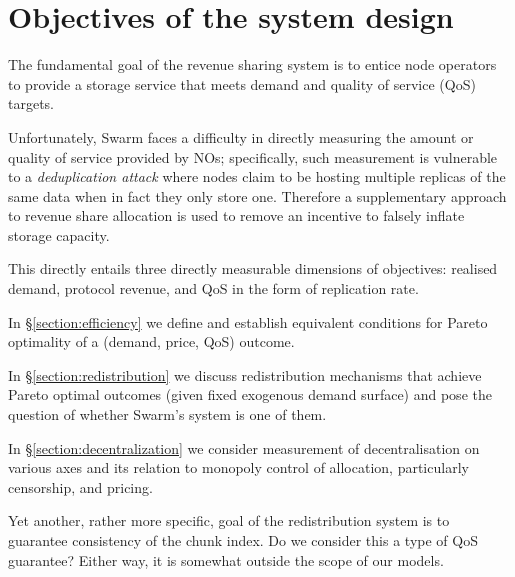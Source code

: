 \newpage

\section{Objectives of the system design}

\begin{notes}

  \item The fundamental goal of the revenue sharing system is to entice node operators to provide a storage service that meets demand and quality of service (QoS) targets.

  Unfortunately, Swarm faces a difficulty in directly measuring the amount or quality of service provided by NOs; specifically, such measurement is vulnerable to a \emph{deduplication attack} where nodes claim to be hosting multiple replicas of the same data when in fact they only store one.
  Therefore a supplementary approach to revenue share allocation is used to remove an incentive to falsely inflate storage capacity.

  \item This directly entails three directly measurable dimensions of objectives: realised demand, protocol revenue, and QoS in the form of replication rate.

  \item In \S\ref{section:efficiency} we define and establish equivalent conditions for Pareto optimality of a (demand, price, QoS) outcome.

  \item In \S\ref{section:redistribution} we discuss redistribution mechanisms that achieve Pareto optimal outcomes (given fixed exogenous demand surface) and pose the question of whether Swarm's system is one of them.

  \item In \S\ref{section:decentralization} we consider measurement of decentralisation on various axes and its relation to monopoly control of allocation, particularly censorship, and pricing.

  \item Yet another, rather more specific, goal of the redistribution system is to guarantee consistency of the chunk index. Do we consider this a type of QoS guarantee? Either way, it is somewhat outside the scope of our models.

\end{notes}

